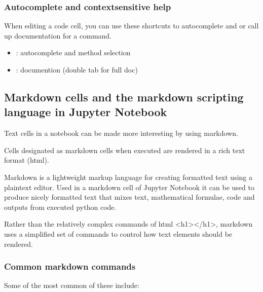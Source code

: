 \documentclass[letterpaper,10pt,english]{jupyterBook}
\begin{document}
\subsubsection{Auto\sphinxhyphen{}complete and context\sphinxhyphen{}sensitive help}
\label{\detokenize{content/04_PythonEssentials/Intro_Jupyter_notebook:auto-complete-and-context-sensitive-help}}
\sphinxAtStartPar
When editing a code cell, you can use these short\sphinxhyphen{}cuts to autocomplete and or call up documentation for a command.
\begin{itemize}
\item {} 
\sphinxAtStartPar
{}: autocomplete and  method selection

\item {} 
\sphinxAtStartPar
{}: documention (double tab for full doc)

\end{itemize}


\subsection{Markdown cells and the markdown scripting language in Jupyter Notebook}
\label{\detokenize{content/04_PythonEssentials/Intro_Jupyter_notebook:markdown-cells-and-the-markdown-scripting-language-in-jupyter-notebook}}
\sphinxAtStartPar
Text cells in a notebook can be made more interesting by using markdown.

\sphinxAtStartPar
Cells designated as markdown cells when executed are rendered in a rich text format (html).

\sphinxAtStartPar
Markdown is a lightweight markup language for creating formatted text using a plain\sphinxhyphen{}text editor.  Used in a markdown cell of Jupyter Notebook it can be used to produce nicely formatted text that mixes text, mathematical formulae, code and outputs from executed python code.

\sphinxAtStartPar
Rather than the relatively complex commands of html <h1></h1>, markdown uses a simplified set of commands to control how text elements should be rendered.


\subsubsection{Common markdown commands}
\label{\detokenize{content/04_PythonEssentials/Intro_Jupyter_notebook:common-markdown-commands}}
\sphinxAtStartPar
Some of the most common of these include:
\end{document}
